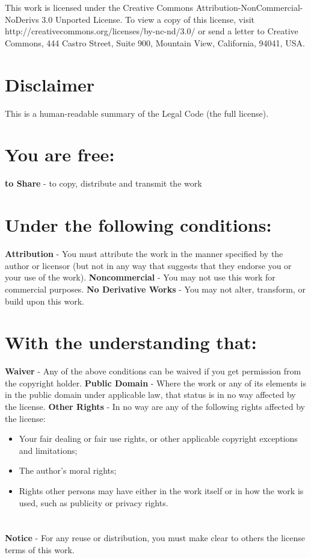 \clearpage
\thispagestyle{empty}
\setcounter{secnumdepth}{0}
\label{sec:appendixLbrief}
\\ \\
This work is licensed under the Creative Commons
Attribution-NonCommercial-NoDerivs 3.0 Unported License. To view a copy of this
license, visit http://creativecommons.org/licenses/by-nc-nd/3.0/ or send a
letter to Creative Commons, 444 Castro Street, Suite 900, Mountain View,
California, 94041, USA.

\section{Disclaimer}
This is a human-readable summary of the Legal Code (the full license).
\section{You are free:}
    \textbf{to Share} - to copy, distribute and transmit the work
\section{Under the following conditions:}
    \textbf{Attribution} - You must attribute the work in the manner specified
    by the author or licensor (but not in any way that suggests that they
    endorse you or your use of the work).
    \textbf{Noncommercial} - You may not use this work for commercial purposes.
    \textbf{No Derivative Works} - You may not alter, transform, or build upon
    this work.
\section{With the understanding that:}
    \textbf{Waiver} - Any of the above conditions can be waived if you get
    permission from the copyright holder.
    \textbf{Public Domain} - Where the work or any of its elements is in the
    public domain under applicable law, that status is in no way affected by the
    license.
    \textbf{Other Rights} - In no way are any of the following rights affected
    by the license:
      \begin{itemize} 
        \item {Your fair dealing or fair use rights, or other applicable
      copyright exceptions and limitations;} 
        \item {The author's moral rights;} 
        \item {Rights other persons may have either in the work itself or in how
      the work is used, such as publicity or privacy rights.}
      \end{itemize}
\section{}
\textbf{Notice} - For any reuse or distribution, you must make clear to
    others the license terms of this work.


